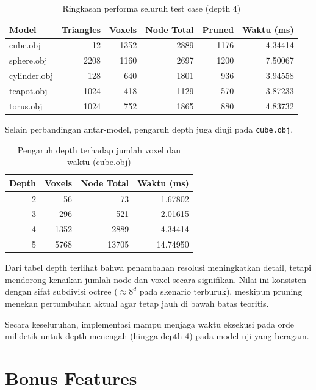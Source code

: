 \documentclass[11pt,a4paper]{article}
\begin{document}
\begin{table}[H]
    \centering
    \caption{Ringkasan performa seluruh test case (depth 4)}
    \begin{tabular}{lrrrrr}
        \toprule
        Model & Triangles & Voxels & Node Total & Pruned & Waktu (ms) \\
        \midrule
        cube.obj & 12 & 1352 & 2889 & 1176 & 4.34414 \\
        sphere.obj & 2208 & 1160 & 2697 & 1200 & 7.50067 \\
        cylinder.obj & 128 & 640 & 1801 & 936 & 3.94558 \\
        teapot.obj & 1024 & 418 & 1129 & 570 & 3.87233 \\
        torus.obj & 1024 & 752 & 1865 & 880 & 4.83732 \\
        \bottomrule
    \end{tabular}
\end{table}

Selain perbandingan antar-model, pengaruh depth juga diuji pada \texttt{cube.obj}.

\begin{table}[H]
    \centering
    \caption{Pengaruh depth terhadap jumlah voxel dan waktu (cube.obj)}
    \begin{tabular}{rrrr}
        \toprule
        Depth & Voxels & Node Total & Waktu (ms) \\
        \midrule
        2 & 56 & 73 & 1.67802 \\
        3 & 296 & 521 & 2.01615 \\
        4 & 1352 & 2889 & 4.34414 \\
        5 & 5768 & 13705 & 14.74950 \\
        \bottomrule
    \end{tabular}
\end{table}

Dari tabel depth terlihat bahwa penambahan resolusi meningkatkan detail,
tetapi mendorong kenaikan jumlah node dan voxel secara signifikan.
Nilai ini konsisten dengan sifat subdivisi octree ($\approx 8^d$ pada skenario terburuk),
meskipun pruning menekan pertumbuhan aktual agar tetap jauh di bawah batas teoritis.

Secara keseluruhan, implementasi mampu menjaga waktu eksekusi pada orde milidetik
untuk depth menengah (hingga depth 4) pada model uji yang beragam.

\section{Bonus Features}\label{sec:bonus}
\end{document}
